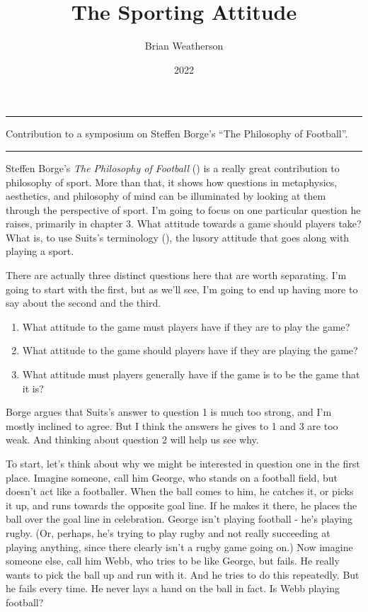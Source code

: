 \documentclass[
  10pt,
  letterpaper,
  DIV=11,
  numbers=noendperiod,
  twoside]{scrartcl}
\title{The Sporting Attitude}
\author{Brian Weatherson}
\date{2022}
\providecommand{\tightlist}{%
  \setlength{\itemsep}{0pt}\setlength{\parskip}{0pt}}\usepackage{longtable,booktabs,array}
\renewenvironment{abstract}
 {\vspace{-1.25cm}
 \quotation\small\noindent\rule{\linewidth}{.5pt}\par\smallskip
 \noindent }
 {\par\noindent\rule{\linewidth}{.5pt}\endquotation}
\begin{document}
\maketitle
\begin{abstract}
Contribution to a symposium on Steffen Borge's ``The Philosophy of
Football''.
\end{abstract}

Steffen Borge's \emph{The Philosophy of Football}
() is a really great contribution to
philosophy of sport. More than that, it shows how questions in
metaphysics, aesthetics, and philosophy of mind can be illuminated by
looking at them through the perspective of sport. I'm going to focus on
one particular question he raises, primarily in chapter 3. What attitude
towards a game should players take? What is, to use Suits's terminology
(), the lusory attitude that goes
along with playing a sport.

There are actually three distinct questions here that are worth
separating. I'm going to start with the first, but as we'll see, I'm
going to end up having more to say about the second and the third.

\begin{enumerate}
\def\labelenumi{\arabic{enumi}.}
\tightlist
\item
  What attitude to the game must players have if they are to play the
  game?
\item
  What attitude to the game should players have if they are playing the
  game?
\item
  What attitude must players generally have if the game is to be the
  game that it is?
\end{enumerate}

Borge argues that Suits's answer to question 1 is much too strong, and
I'm mostly inclined to agree. But I think the answers he gives to 1 and
3 are too weak. And thinking about question 2 will help us see why.

To start, let's think about why we might be interested in question one
in the first place. Imagine someone, call him George, who stands on a
football field, but doesn't act like a footballer. When the ball comes
to him, he catches it, or picks it up, and runs towards the opposite
goal line. If he makes it there, he places the ball over the goal line
in celebration. George isn't playing football - he's playing rugby. (Or,
perhaps, he's trying to play rugby and not really succeeding at playing
anything, since there clearly isn't a rugby game going on.) Now imagine
someone else, call him Webb, who tries to be like George, but fails. He
really wants to pick the ball up and run with it. And he tries to do
this repeatedly. But he fails every time. He never lays a hand on the
ball in fact. Is Webb playing football?
\end{document}
